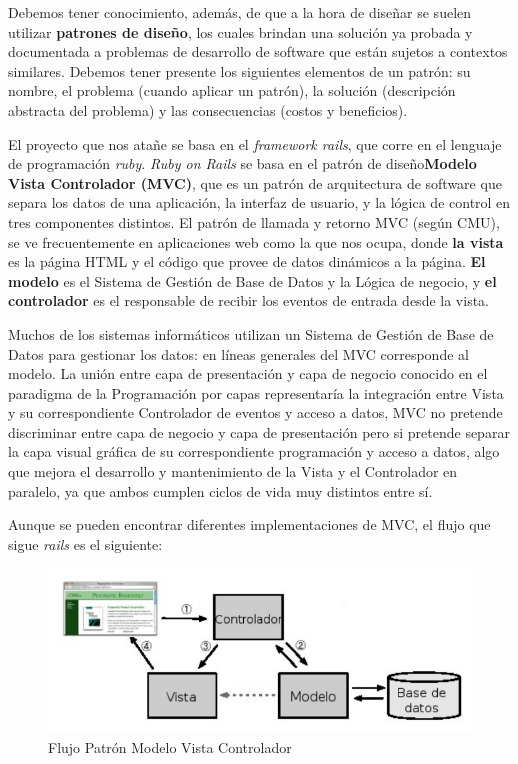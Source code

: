 			Debemos tener conocimiento, además, de que a la hora de diseñar se suelen utilizar \textbf{patrones de diseño}, los cuales brindan una solución ya probada y documentada a problemas de desarrollo de software que están sujetos a contextos similares. Debemos tener presente los siguientes elementos de un patrón: su nombre, el problema (cuando aplicar un patrón), la solución (descripción abstracta del problema) y las consecuencias (costos y beneficios).

			El proyecto que nos atañe se basa en el \textit{framework rails}, que corre en el lenguaje de programación \textit{ruby}. \textit{Ruby on Rails} se basa en el patrón de diseño\textbf{Modelo Vista Controlador (MVC)}, que es un patrón de arquitectura de software que separa los datos de una aplicación, la interfaz de usuario, y la lógica de control en tres componentes distintos. El patrón de llamada y retorno MVC (según CMU), se ve frecuentemente en aplicaciones web como la que nos ocupa, donde \textbf{la vista} es la página HTML y el código que provee de datos dinámicos a la página. \textbf{El modelo} es el Sistema de Gestión de Base de Datos y la Lógica de negocio, y \textbf{el controlador} es el responsable de recibir los eventos de entrada desde la vista. 	

			Muchos de los sistemas informáticos utilizan un Sistema de Gestión de Base de Datos para gestionar los datos: en líneas generales del MVC corresponde al modelo. La unión entre capa de presentación y capa de negocio conocido en el paradigma de la Programación por capas representaría la integración entre Vista y su correspondiente Controlador de eventos y acceso a datos, MVC no pretende discriminar entre capa de negocio y capa de presentación pero si pretende separar la capa visual gráfica de su correspondiente programación y acceso a datos, algo que mejora el desarrollo y mantenimiento de la Vista y el Controlador en paralelo, ya que ambos cumplen ciclos de vida muy distintos entre sí.

			Aunque se pueden encontrar diferentes implementaciones de MVC, el flujo que sigue \textit{rails} es el siguiente:

			\begin{figure}[H]
			  \centering
			    \includegraphics[width=16cm]{img/png/mvc.png}
			  \caption{Flujo Patrón Modelo Vista Controlador}
			  \label{fig:patron_mvc}
			\end{figure}

